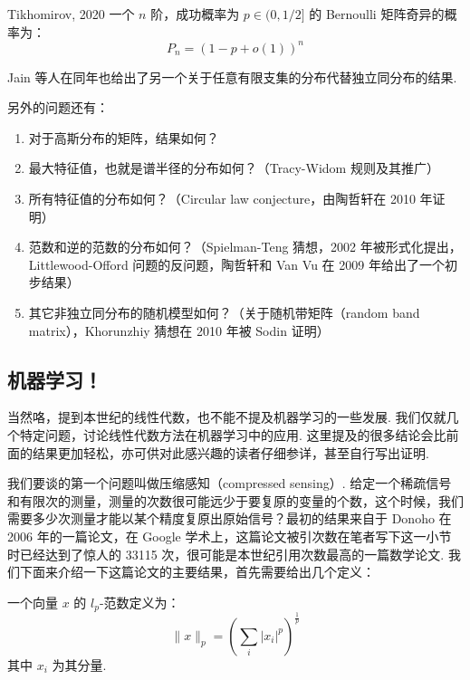 \begin{theorem}{Tikhomirov, 2020}{}
    一个 $n$ 阶，成功概率为 $p \in (0, 1/2]$ 的 Bernoulli 矩阵奇异的概率为：
    \[ P_n = \left( 1 - p + o(1) \right)^n \]
\end{theorem}

Jain 等人在同年也给出了另一个关于任意有限支集的分布代替独立同分布的结果.

另外的问题还有：
\begin{enumerate}
    \item 对于高斯分布的矩阵，结果如何？

    \item 最大特征值，也就是谱半径的分布如何？（Tracy-Widom 规则及其推广）

    \item 所有特征值的分布如何？（Circular law conjecture，由陶哲轩在 2010 年证明）

    \item 范数和逆的范数的分布如何？（Spielman-Teng 猜想，2002 年被形式化提出，Littlewood-Offord 问题的反问题，陶哲轩和 Van Vu 在 2009 年给出了一个初步结果）

    \item 其它非独立同分布的随机模型如何？（关于随机带矩阵（random band matrix），Khorunzhiy 猜想在 2010 年被 Sodin 证明）
\end{enumerate}

\subsection{机器学习！}

当然咯，提到本世纪的线性代数，也不能不提及机器学习的一些发展. 我们仅就几个特定问题，讨论线性代数方法在机器学习中的应用. 这里提及的很多结论会比前面的结果更加轻松，亦可供对此感兴趣的读者仔细参详，甚至自行写出证明.

我们要谈的第一个问题叫做压缩感知（compressed sensing）. 给定一个稀疏信号和有限次的测量，测量的次数很可能远少于要复原的变量的个数，这个时候，我们需要多少次测量才能以某个精度复原出原始信号？最初的结果来自于 Donoho 在 2006 年的一篇论文，在 Google 学术上，这篇论文被引次数在笔者写下这一小节时已经达到了惊人的 33115 次，很可能是本世纪引用次数最高的一篇数学论文. 我们下面来介绍一下这篇论文的主要结果，首先需要给出几个定义：

\begin{definition}{}{}
    一个向量 $x$ 的 $l_p$-范数定义为：
    \[ \lVert x \rVert_p = \left( \sum_{i}|x_i|^p \right)^{\frac{1}{p}} \]
    其中 $x_i$ 为其分量.
\end{definition}


